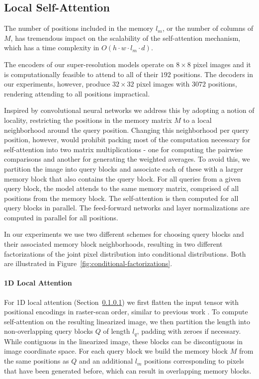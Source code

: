 \documentclass{article}
\newcommand{\modeldim}{d}
\begin{document}
\subsection{Local Self-Attention}
\label{sec:local-self-attention}

The number of positions included in the memory $l_{m}$, or the number of columns of $M$, has tremendous impact on the scalability of the self-attention mechanism, which has a time complexity in $O(h \cdot w \cdot l_{m} \cdot \modeldim)$.

The encoders of our super-resolution models operate on $8\times8$ pixel images and it is computationally feasible to attend to all of their $192$ positions. The decoders in our experiments, however, produce $32\times32$ pixel images with $3072$ positions, rendering attending to all positions impractical.

Inspired by convolutional neural networks we address this by adopting a notion of locality, restricting the positions in the memory matrix $M$ to a local neighborhood around the query position. Changing this neighborhood per query position, however, would prohibit packing most of the computation necessary for self-attention into two matrix multiplications - one for computing the pairwise comparisons and another for generating the weighted averages. To avoid this, we partition the image into query blocks and associate each of these with a larger memory block that also contains the query block. For all queries from a given query block, the model attends to the same memory matrix, comprised of all positions from the memory block.
The self-attention is then computed for all query blocks in parallel.
The feed-forward networks and layer normalizations are computed in parallel for all positions.

In our experiments we use two different schemes for choosing query blocks and their associated memory block neighborhoods, resulting in two different factorizations of the joint pixel distribution into conditional distributions. Both are illustrated in Figure~\ref{fig:conditional-factorizations}.



\paragraph{1D Local Attention} \label{sec:loc-1d} 
For 1D local attention (Section~\ref{sec:loc-1d}) we first flatten the input tensor with positional encodings in raster-scan order, similar to previous work \citep{PixelRNN}. To compute self-attention on the resulting linearized image, we then partition the length into non-overlapping query blocks $Q$ of length $l_{q}$, padding with zeroes if necessary. While contiguous in the linearized image, these blocks can be discontiguous in image coordinate space. For each query block we build the memory block $M$ from the same positions as $Q$ and an additional $l_{m}$ positions corresponding to pixels that have been generated before, which can result in overlapping memory blocks.
\end{document}
